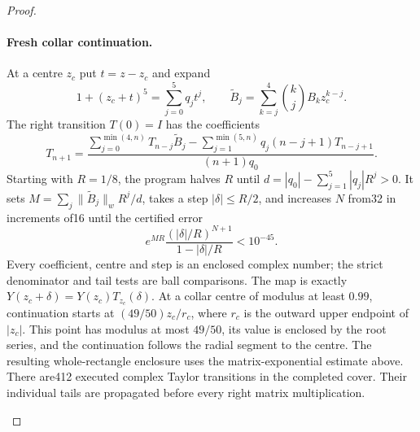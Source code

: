 \begin{proof}
\begin{enumerate}[label=\arabic*.]
\paragraph{Fresh collar continuation.}
At a centre $z_c$ put $t=z-z_c$ and expand
\[
 1+(z_c+t)^5=\sum_{j=0}^5q_jt^j,\qquad
 \widetilde B_j=\sum_{k=j}^4\binom kjB_kz_c^{k-j}.
\]
The right transition $T(0)=I$ has the coefficients
\[
 T_{n+1}=\frac{\displaystyle
 \sum_{j=0}^{\min(4,n)}T_{n-j}\widetilde B_j
 -\sum_{j=1}^{\min(5,n)}q_j(n-j+1)T_{n-j+1}}
 {(n+1)q_0}.
\]
Starting with $R=1/8$, the program halves $R$ until
$d=|q_0|-\sum_{j=1}^5|q_j|R^j>0$.
It sets $M=\sum_j\|\widetilde B_j\|_wR^j/d$, takes a step
$|\delta|\le R/2$, and increases $N$ from32 in increments of16
until the certified error
\[
 e^{MR}\frac{(|\delta|/R)^{N+1}}{1-|\delta|/R}<10^{-45}.
\]
Every coefficient, centre and step is an enclosed complex number;
the strict denominator and tail tests are ball comparisons.
The map is exactly $Y(z_c+\delta)=Y(z_c)T_{z_c}(\delta)$.
At a collar centre of modulus at least $0.99$, continuation starts
at $(49/50)z_c/r_c$, where $r_c$ is the outward upper endpoint
of $|z_c|$. This point has modulus at most $49/50$, its value is
enclosed by the root series, and the continuation follows the
radial segment to the centre.  The resulting
whole-rectangle enclosure uses the matrix-exponential estimate above.
There are412 executed complex Taylor transitions in the completed
cover.  Their individual tails are propagated before every right
matrix multiplication.


\end{enumerate}
\end{proof}
